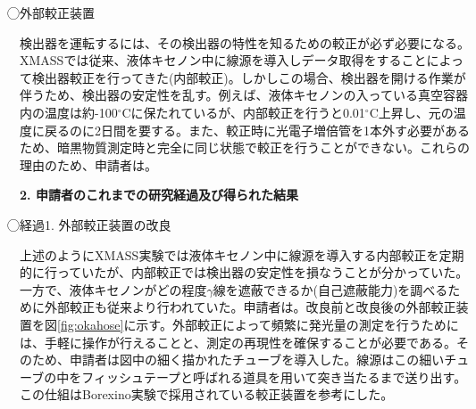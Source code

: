\documentclass[10pt,a4paper,twoside]{jarticle}
\newcommand{\研究課題名}{XMASS検出器を用いた季節変動による暗黒物質の直接探索}
\newcommand{\研究機関名}{神戸大学}
\newcommand{\申請者氏名}{岡直哉}
\newcommand{\研究代表者氏名}{\申請者氏名}
\newcommand{\研究期間の最終元号年度}{29}	%
\begin{document}
{\textcircled{}外部較正装置\par
検出器を運転するには、その検出器の特性を知るための較正が必ず必要になる。XMASSでは従来、液体キセノン中に線源を導入しデータ取得をすることによって検出器較正を行ってきた(内部較正)。しかしこの場合、検出器を開ける作業が伴うため、検出器の安定性を乱す。例えば、液体キセノンの入っている真空容器内の温度は約-100$^\circ$Cに保たれているが、内部較正を行うと0.01$^\circ$C上昇し、元の温度に戻るのに2日間を要する。また、較正時に光電子増倍管を1本外す必要があるため、暗黒物質測定時と完全に同じ状態で較正を行うことができない。これらの理由のため、申請者は{\bf \textcolor{red}{}}。\par
{\bf 2. 申請者のこれまでの研究経過及び得られた結果}\par
\textcircled{}経過1. 外部較正装置の改良\par
上述のようにXMASS実験では液体キセノン中に線源を導入する内部較正を定期的に行っていたが、内部較正では検出器の安定性を損なうことが分かっていた。一方で、液体キセノンがどの程度$\gamma$線を遮蔽できるか(自己遮蔽能力)を調べるために外部較正も従来より行われていた。申請者は{\bf \textcolor{red}{}}。改良前と改良後の外部較正装置を図\ref{fig:okahose}に示す。外部較正によって頻繁に発光量の測定を行うためには、手軽に操作が行えることと、測定の再現性を確保することが必要である。そのため、申請者は図中の細く描かれたチューブを導入した。線源はこの細いチューブの中をフィッシュテープと呼ばれる道具を用いて突き当たるまで送り出す。この仕組はBorexino実験\cite{Borexino}で採用されている較正装置を参考にした。
}
\end{document}
